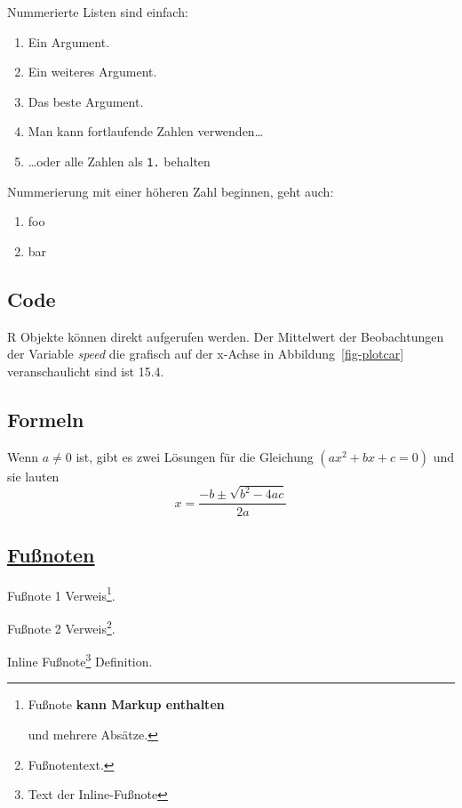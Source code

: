 \documentclass[
  stu,
  floatsintext,
  longtable,
  a4paper,
  nolmodern,
  notxfonts,
  notimes,
  donotrepeattitle,
  colorlinks=true,linkcolor=blue,citecolor=blue,urlcolor=blue]{apa7}
\providecommand{\tightlist}{%
  \setlength{\itemsep}{0pt}\setlength{\parskip}{0pt}}
\begin{document}
Nummerierte Listen sind einfach:

\begin{enumerate}
\def\labelenumi{\arabic{enumi}.}
\item
  Ein Argument.
\item
  Ein weiteres Argument.
\item
  Das beste Argument.
\item
  Man kann fortlaufende Zahlen verwenden\ldots{}
\item
  \ldots oder alle Zahlen als \texttt{1.} behalten
\end{enumerate}

Nummerierung mit einer höheren Zahl beginnen, geht auch:

\begin{enumerate}
\def\labelenumi{\arabic{enumi}.}
\setcounter{enumi}{56}
\tightlist
\item
  foo
\item
  bar
\end{enumerate}

\subsection{Code}\label{code}

R Objekte können direkt aufgerufen werden. Der Mittelwert der
Beobachtungen der Variable \emph{speed} die grafisch auf der x-Achse in
Abbildung~\ref{fig-plotcar} veranschaulicht sind ist 15.4.

\subsection{Formeln}\label{formeln}

Wenn \(a \ne 0\) ist, gibt es zwei Lösungen für die Gleichung
\((ax^2 + bx + c = 0)\) und sie lauten
\[ x = \frac{-b \pm \sqrt{b^2-4ac}}{2a} \]

\subsection{\texorpdfstring{\href{https://github.com/markdown-it/markdown-it-footnote}{Fußnoten}}{Fußnoten}}\label{fuuxdfnoten}

Fußnote 1 Verweis\footnote{Fußnote \textbf{kann Markup enthalten}

  und mehrere Absätze.}.

Fußnote 2 Verweis\footnote{Fußnotentext.}.

Inline Fußnote\footnote{Text der Inline-Fußnote} Definition.
\end{document}

